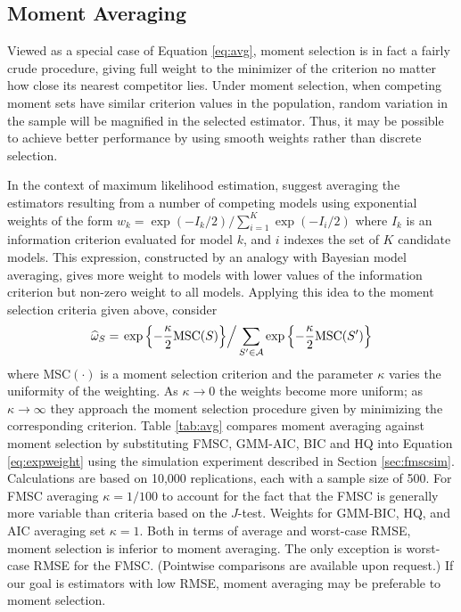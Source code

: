 \documentclass[12pt]{article}
\theoremstyle{definition}
\begin{document}
\subsection{Moment Averaging}
Viewed as a special case of Equation \ref{eq:avg}, moment selection is in fact a fairly crude procedure, giving full weight to the minimizer of the criterion no matter how close its nearest competitor lies. Under moment selection, when competing moment sets have similar criterion values in the population, random variation in the sample will be magnified in the selected estimator. Thus, it may be possible to achieve better performance by using smooth weights rather than discrete selection. %

In the context of maximum likelihood estimation, \cite{Burnhametal} suggest averaging the estimators resulting from a number of competing models using exponential weights of the form $w_k = \exp(-I_k/2)/\sum_{i=1}^K \exp(-I_i/2)$ where $I_k$ is an information criterion evaluated for model $k$, and $i$ indexes the set of $K$ candidate models. This expression, constructed by an analogy with Bayesian model averaging, gives more weight to models with lower values of the information criterion but non-zero weight to all models. Applying this idea to the moment selection criteria given above, consider
	\begin{equation}	
		\widehat{\omega}_S = \left.\exp\left\{-\frac{\kappa}{2} \mbox{MSC}(S)\right\}\right/\sum_{S' \in \mathcal{A}}\exp\left\{-\frac{\kappa}{2} \mbox{MSC}(S')\right\}
		\label{eq:expweight}
\end{equation}
where MSC$(\cdot)$ is a moment selection criterion and the parameter $\kappa$ varies the uniformity of the weighting. As $\kappa \rightarrow 0$ the weights become more uniform; as $\kappa \rightarrow \infty$ they approach the moment selection procedure given by minimizing the corresponding criterion. Table \ref{tab:avg} compares moment averaging against moment selection by substituting FMSC, GMM-AIC, BIC and HQ into Equation \ref{eq:expweight} using the simulation experiment described in Section \ref{sec:fmscsim}. Calculations are based on 10,000 replications, each with a sample size of 500. For FMSC averaging $\kappa = 1/100$ to account for the fact that the FMSC is generally more variable than criteria based on the $J$-test. Weights for GMM-BIC, HQ, and AIC averaging set $\kappa = 1$. Both in terms of average and worst-case RMSE, moment selection is inferior to moment averaging. The only exception is worst-case RMSE for the FMSC. (Pointwise comparisons are available upon request.) If our goal is estimators with low RMSE, moment averaging may be preferable to moment selection. 
\end{document}
